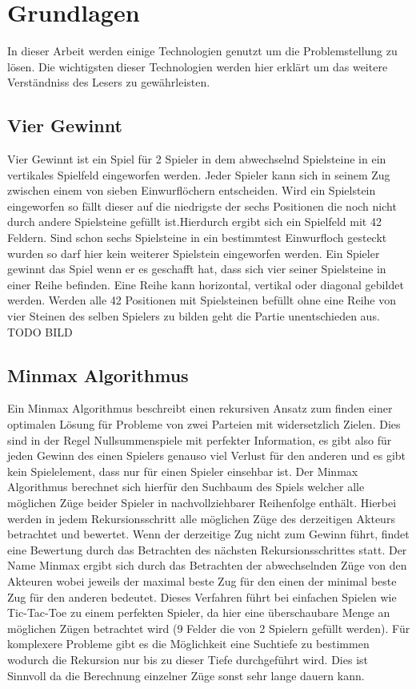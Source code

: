\chapter{Grundlagen}%

\label{cha:Schluss}

In dieser Arbeit werden einige Technologien genutzt um die Problemstellung zu lösen.
Die wichtigsten dieser Technologien werden hier erklärt um das weitere Verständniss des Lesers zu gewährleisten. 


\section{Vier Gewinnt}
Vier Gewinnt ist ein Spiel für 2 Spieler in dem abwechselnd Spielsteine in ein vertikales Spielfeld eingeworfen werden. Jeder Spieler kann sich in seinem Zug zwischen einem von sieben Einwurflöchern entscheiden. Wird ein Spielstein eingeworfen so fällt dieser auf die niedrigste der sechs Positionen die noch nicht durch andere Spielsteine gefüllt ist.Hierdurch ergibt sich ein Spielfeld mit 42 Feldern.  Sind schon sechs Spielsteine in ein bestimmtest Einwurfloch gesteckt wurden so darf hier kein weiterer Spielstein eingeworfen werden. Ein Spieler gewinnt das Spiel wenn er es geschafft  hat, dass sich vier seiner Spielsteine in einer Reihe befinden. Eine Reihe kann horizontal, vertikal oder diagonal gebildet werden. Werden alle 42 Positionen mit Spielsteinen befüllt ohne eine Reihe von vier Steinen des selben Spielers zu bilden geht die Partie unentschieden aus.
\colorbox{red!30}{TODO BILD}


\section{Minmax Algorithmus}
Ein Minmax Algorithmus beschreibt einen rekursiven Ansatz zum finden einer optimalen Lösung für Probleme von zwei Parteien mit widersetzlich Zielen. Dies sind in der Regel Nullsummenspiele mit perfekter Information, es gibt also für jeden Gewinn des einen Spielers genauso viel Verlust für den anderen und es gibt kein Spielelement, dass nur für einen Spieler einsehbar ist. Der Minmax Algorithmus berechnet sich hierfür den Suchbaum des Spiels welcher alle möglichen Züge beider Spieler in nachvollziehbarer Reihenfolge enthält. Hierbei werden in jedem Rekursionsschritt alle möglichen Züge des derzeitigen Akteurs betrachtet und bewertet. Wenn der derzeitige Zug nicht zum Gewinn führt, findet eine Bewertung durch das Betrachten des nächsten Rekursionsschrittes statt. Der Name Minmax ergibt sich durch das Betrachten der abwechselnden Züge von den Akteuren wobei jeweils der maximal beste Zug für den einen der minimal beste Zug für den anderen bedeutet.  Dieses Verfahren führt bei einfachen Spielen wie Tic-Tac-Toe zu einem perfekten Spieler, da hier eine überschaubare Menge an möglichen Zügen betrachtet wird (9 Felder die von 2 Spielern gefüllt werden). Für komplexere Probleme gibt es die Möglichkeit eine Suchtiefe zu bestimmen wodurch die Rekursion  nur bis zu dieser Tiefe durchgeführt wird. Dies ist Sinnvoll da die Berechnung einzelner Züge sonst sehr lange dauern kann.

